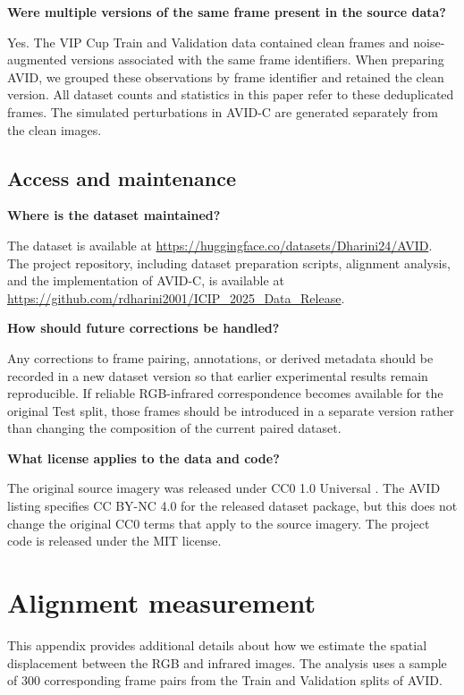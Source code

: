 \documentclass[10pt]{article}
\newcommand{\dataset}{\textsc{AVID}}
\newcommand{\corrupt}{\textsc{AVID-C}}
\begin{document}
\textbf{Were multiple versions of the same frame present in the source data?}

Yes. The VIP Cup Train and Validation data contained clean frames and noise-augmented versions associated with the same frame identifiers. When preparing \dataset{}, we grouped these observations by frame identifier and retained the clean version. All dataset counts and statistics in this paper refer to these deduplicated frames. The simulated perturbations in \corrupt{} are generated separately from the clean images.

\subsection{Access and maintenance}

\textbf{Where is the dataset maintained?}

The dataset is available at \url{https://huggingface.co/datasets/Dharini24/AVID}. The project repository, including dataset preparation scripts, alignment analysis, and the implementation of \corrupt{}, is available at \url{https://github.com/rdharini2001/ICIP_2025_Data_Release}.

\textbf{How should future corrections be handled?}

Any corrections to frame pairing, annotations, or derived metadata should be recorded in a new dataset version so that earlier experimental results remain reproducible. If reliable RGB-infrared correspondence becomes available for the original Test split, those frames should be introduced in a separate version rather than changing the composition of the current paired dataset.

\textbf{What license applies to the data and code?}

The original source imagery was released under CC0 1.0 Universal \citep{svanstrom2020repository}. The \dataset{} listing specifies CC BY-NC 4.0 for the released dataset package, but this does not change the original CC0 terms that apply to the source imagery. The project code is released under the MIT license.


\section{Alignment measurement}
\label{app:alignment}

This appendix provides additional details about how we estimate the spatial displacement between the RGB and infrared images. The analysis uses a sample of 300 corresponding frame pairs from the Train and Validation splits of \dataset{}.
\end{document}
